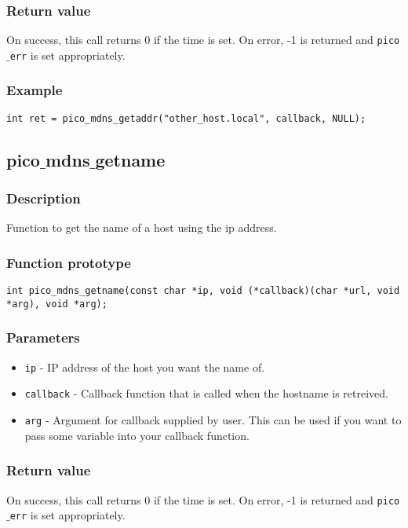 \subsubsection*{Return value}
On success, this call returns 0 if the time is set.
On error, -1 is returned and \texttt{pico$\_$err} is set appropriately.

\subsubsection*{Example}
\begin{verbatim}
int ret = pico_mdns_getaddr("other_host.local", callback, NULL);
\end{verbatim}



\subsection{pico$\_$mdns$\_$getname}

\subsubsection*{Description}
Function to get the name of a host using the ip address.

\subsubsection*{Function prototype}
\begin{verbatim}
int pico_mdns_getname(const char *ip, void (*callback)(char *url, void *arg), void *arg);
\end{verbatim}

\subsubsection*{Parameters}
\begin{itemize}[noitemsep]
\item \texttt{ip} - IP address of the host you want the name of.
\item \texttt{callback} - Callback function that is called when the hostname is retreived.
\item \texttt{arg} - Argument for callback supplied by user. This can be used if you want to pass some variable into your callback function.
\end{itemize}

\subsubsection*{Return value}
On success, this call returns 0 if the time is set.
On error, -1 is returned and \texttt{pico$\_$err} is set appropriately.


